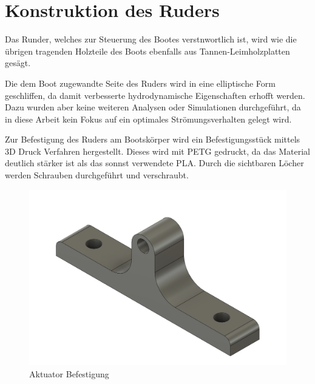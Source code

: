 \section{Konstruktion des Ruders}
Das Runder, welches zur Steuerung des Bootes verstnwortlich ist, wird wie die übrigen tragenden Holzteile des Boots ebenfalls aus Tannen-Leimholzplatten gesägt.

Die dem Boot zugewandte Seite des Ruders wird in eine elliptische Form geschliffen, da damit verbesserte hydrodynamische Eigenschaften erhofft werden. Dazu wurden aber keine weiteren Analysen oder Simulationen durchgeführt, da in diese Arbeit kein Fokus auf ein optimales Strömungsverhalten gelegt wird.

Zur Befestigung des Ruders am Bootskörper wird ein Befestigungsstück mittels 3D Druck Verfahren hergestellt. Dieses wird mit PETG gedruckt, da das Material deutlich stärker ist als das sonnst verwendete PLA. Durch die sichtbaren Löcher werden Schrauben durchgeführt und verschraubt. 

\begin{figure}[H]
    \centering
    \includegraphics[width=0.3\linewidth]{assets/rudder_connector_image.png}
    \caption{Aktuator Befestigung}
    
\end{figure}